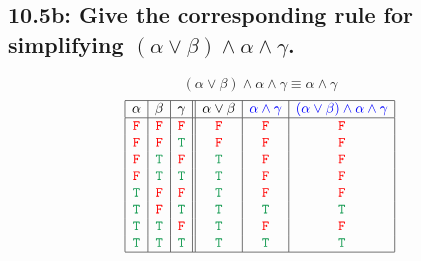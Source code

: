 \documentclass{article}
\begin{document}
\subsection*{10.5b: Give the corresponding rule for simplifying $(\alpha\lor\beta)\land\alpha\land\gamma$.}
\[(\alpha\lor\beta)\land\alpha\land\gamma\equiv\alpha\land\gamma\]
\[\begin{array}{|c|c|c||c|c|c|}
\hline
\alpha&\beta&\gamma&\alpha\lor\beta&\textcolor{blue}{\alpha\land\gamma}&\textcolor{blue}{(\alpha\lor\beta)\land\alpha\land\gamma}\\
\hline
\textcolor{red}{\tt{F}}&\textcolor{red}{\tt{F}}&\textcolor{red}{\tt{F}}&\textcolor{red}{\tt{F}}&\textcolor{red}{\tt{F}}&\textcolor{red}{\tt{F}}\\
\textcolor{red}{\tt{F}}&\textcolor{red}{\tt{F}}&\textcolor{ForestGreen}{\tt{T}}&\textcolor{red}{\tt{F}}&\textcolor{red}{\tt{F}}&\textcolor{red}{\tt{F}}\\
\textcolor{red}{\tt{F}}&\textcolor{ForestGreen}{\tt{T}}&\textcolor{red}{\tt{F}}&\textcolor{ForestGreen}{\tt{T}}&\textcolor{red}{\tt{F}}&\textcolor{red}{\tt{F}}\\
\textcolor{red}{\tt{F}}&\textcolor{ForestGreen}{\tt{T}}&\textcolor{ForestGreen}{\tt{T}}&\textcolor{ForestGreen}{\tt{T}}&\textcolor{red}{\tt{F}}&\textcolor{red}{\tt{F}}\\
\textcolor{ForestGreen}{\tt{T}}&\textcolor{red}{\tt{F}}&\textcolor{red}{\tt{F}}&\textcolor{ForestGreen}{\tt{T}}&\textcolor{red}{\tt{F}}&\textcolor{red}{\tt{F}}\\
\textcolor{ForestGreen}{\tt{T}}&\textcolor{red}{\tt{F}}&\textcolor{ForestGreen}{\tt{T}}&\textcolor{ForestGreen}{\tt{T}}&\textcolor{ForestGreen}{\tt{T}}&\textcolor{ForestGreen}{\tt{T}}\\
\textcolor{ForestGreen}{\tt{T}}&\textcolor{ForestGreen}{\tt{T}}&\textcolor{red}{\tt{F}}&\textcolor{ForestGreen}{\tt{T}}&\textcolor{red}{\tt{F}}&\textcolor{red}{\tt{F}}\\
\textcolor{ForestGreen}{\tt{T}}&\textcolor{ForestGreen}{\tt{T}}&\textcolor{ForestGreen}{\tt{T}}&\textcolor{ForestGreen}{\tt{T}}&\textcolor{ForestGreen}{\tt{T}}&\textcolor{ForestGreen}{\tt{T}}\\
\hline
\end{array}\]
\end{document}
